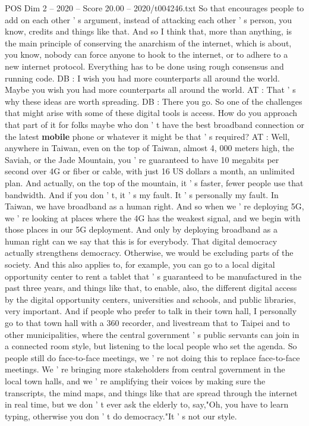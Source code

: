 \begin{textsample}{POS Dim 2 – 2020 – Score 20.00 – 2020/t004246.txt}
So that encourages people to add on each other ' s argument, instead of attacking each other ' s person, you know, credits and things like that.
And so I think that, more than anything, is the main principle of conserving the anarchism of the internet, which is about, you know, nobody can force anyone to hook to the internet, or to adhere to a new internet protocol.
Everything has to be done using rough consensus and running code.
DB : I wish you had more counterparts all around the world.
Maybe you wish you had more counterparts all around the world.
AT : That ' s why these ideas are worth spreading.
DB : There you go.
So one of the challenges that might arise with some of these digital tools is access.
How do you approach that part of it for folks maybe who don ' t have the best broadband connection or the latest \textbf{mobile} phone or whatever it might be that ' s required?
AT : Well, anywhere in Taiwan, even on the top of Taiwan, almost 4, 000 meters high, the Saviah, or the Jade Mountain, you ' re guaranteed to have 10 megabits per second over 4G or fiber or cable, with just 16 US dollars a month, an unlimited plan.
And actually, on the top of the mountain, it ' s faster, fewer people use that bandwidth.
And if you don ' t, it ' s my fault.
It ' s personally my fault.
In Taiwan, we have broadband as a human right.
And so when we ' re deploying 5G, we ' re looking at places where the 4G has the weakest signal, and we begin with those places in our 5G deployment.
And only by deploying broadband as a human right can we say that this is for everybody.
That digital democracy actually strengthens democracy.
Otherwise, we would be excluding parts of the society.
And this also applies to, for example, you can go to a local digital opportunity center to rent a tablet that ' s guaranteed to be manufactured in the past three years, and things like that, to enable, also, the different digital access by the digital opportunity centers, universities and schools, and public libraries, very important.
And if people who prefer to talk in their town hall, I personally go to that town hall with a 360 recorder, and livestream that to Taipei and to other municipalities, where the central government ' s public servants can join in a connected room style, but listening to the local people who set the agenda.
So people still do face-to-face meetings, we ' re not doing this to replace face-to-face meetings.
We ' re bringing more stakeholders from central government in the local town halls, and we ' re amplifying their voices by making sure the transcripts, the mind maps, and things like that are spread through the internet in real time, but we don ' t ever ask the elderly to, say,"Oh, you have to learn typing, otherwise you don ' t do democracy."It ' s not our style.

\end{textsample}
